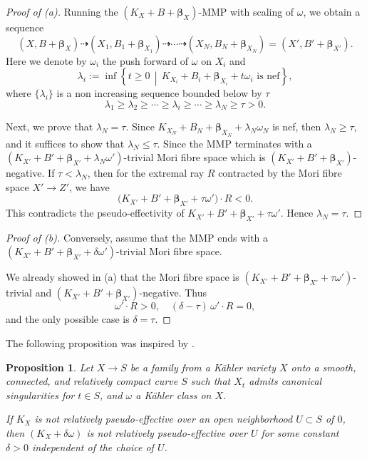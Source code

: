 \documentclass[12pt]{amsart}
\numberwithin{equation}{section}
\newtheorem{proposition}[theorem]{Proposition}
\theoremstyle{definition}
\theoremstyle{plain}
\newtheorem*{thm A*}{Theorem A}
\newtheorem*{thm B*}{Theorem B}
\newtheorem*{thm C*}{Theorem C}
\newtheorem*{thm D*}{Theorem D}
\theoremstyle{definition}
\renewcommand{\1}{\mathds{1}}
\newcommand{\bbeta}{\boldsymbol{\beta}}
\renewcommand{\>}{\rightarrow}
\begin{document}
\begin{proof}[Proof of (a)]
Running the $(K_X+B+\bbeta_X)$-MMP with scaling of $\omega$, we obtain a sequence
$$
(X,B+\bbeta_X) \dashrightarrow (X_1,B_1+\bbeta_{X_{1}}) \dashrightarrow  \cdots 
\dashrightarrow (X_N,B_N+\bbeta_{X_{N}}) = (X',B'+\bbeta_{X'}).
$$
Here we denote by $\omega_i$ the push forward of $\omega$ on $X_i$ and  
$$
\lambda_i := \inf \left\{ t \ge 0 \,\middle|\, K_{X_i}+B_i+\bbeta_{X_i}+t\omega_i \text{ is nef} \right\},
$$
where $\{\lambda_i\}$ is a non increasing sequence bounded below by $\tau$
$$
\lambda_1 \ge \lambda_2 \ge \cdots \ge \lambda_i \ge \cdots \ge \lambda_N \ge \tau>0.
$$


Next, we prove that $\lambda_N = \tau$. Since $K_{X_N}+B_N+\bbeta _{X_N}+\lambda _N\omega _N$ is nef, then $\lambda _N\geq \tau$, and it suffices to show that $\lambda_N \le \tau$.  
Since the MMP terminates with a $(K_{X'}+B'+\bbeta_{X'}+\lambda_N\omega')$-trivial Mori fibre space which is $(K_{X'}+B'+\bbeta_{X'})$-negative.  
If $\tau < \lambda_N$, then for the extremal ray $R$ contracted by the Mori fibre space
$X' \to Z'$, we have
$$
\bigl(K_{X'}+B'+\bbeta_{X'}+\tau\omega'\bigr)\cdot R < 0.
$$
This contradicts the pseudo-effectivity of
$K_{X'}+B'+\bbeta_{X'}+\tau\omega'$.  
Hence $\lambda_N = \tau$. 
\end{proof}

\begin{proof}[Proof of (b)]
Conversely, assume that the MMP ends with a $(K_{X'}+ B' + \bbeta_{X'}+ \delta \omega')$-trivial Mori fibre space.

We already showed in (a) that the Mori fibre space is $(K_{X'}+ B' + \bbeta_{X'} + \tau \omega')$-trivial and $(K_{X'}+ B' + \bbeta_{X'})$-negative. Thus
$$
\omega' \cdot R > 0, \quad (\delta - \tau)\,\omega' \cdot R = 0,
$$
and the only possible case is $\delta = \tau$.
\end{proof}
The following proposition was inspired by \cite[Lemma 2.35]{BAB}.

\begin{proposition}\label{pseffthreshold}
Let $X \to S$ be a family from a  K\"ahler variety $X$ onto a smooth, connected, and relatively compact curve $S$ such that $X_t$ admits canonical singularities for $t\in S$, and $\omega$ a K\"ahler class on $X$. 

If $K_X$ is not relatively pseudo-effective over an  open neighborhood $U \subset S$ of $0$, then $(K_X  + \delta \omega)$ is not relatively pseudo-effective over $U$ for some constant $\delta >0$ independent of the choice of $U$.
\end{proposition}
\end{document}
